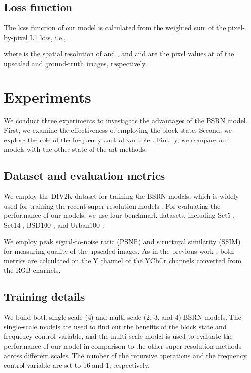\documentclass[runningheads]{llncs}
\begin{document}
\subsection{Loss function}

The loss function of our model is calculated from the weighted sum of the pixel-by-pixel L1 loss, i.e.,

where  is the spatial resolution of  and , and  and  are the pixel values at  of the upscaled and ground-truth images, respectively.



\section{Experiments}
\label{sec:experiments}

We conduct three experiments to investigate the advantages of the BSRN model.
First, we examine the effectiveness of employing the block state.
Second, we explore the role of the frequency control variable .
Finally, we compare our models with the other state-of-the-art methods.


\subsection{Dataset and evaluation metrics}

We employ the DIV2K dataset \cite{agustsson2017ntire} for training the BSRN models, which is widely used for training the recent super-resolution models \cite{ahn2018fast,kim2018deep}.
For evaluating the performance of our models, we use four benchmark datasets, including Set5 \cite{bevilacqua2012low}, Set14 \cite{zeyde2010single}, BSD100 \cite{martin2001database}, and Urban100 \cite{huang2015single}.

We employ peak signal-to-noise ratio (PSNR) and structural similarity (SSIM) \cite{wang2004image} for measuring quality of the upscaled images.
As in the previous work \cite{ahn2018fast,hui2018fast}, both metrics are calculated on the Y channel of the YCbCr channels converted from the RGB channels.



\subsection{Training details}

We build both single-scale (4) and multi-scale (2, 3, and 4) BSRN models.
The single-scale models are used to find out the benefits of the block state and frequency control variable, and the multi-scale model is used to evaluate the performance of our model in comparison to the other super-resolution methods across different scales.
The number of the recursive operations  and the frequency control variable  are set to 16 and 1, respectively.
\end{document}
